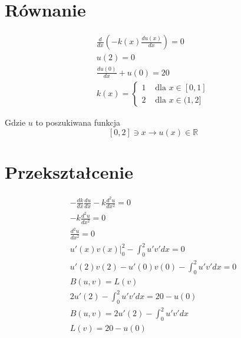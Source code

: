 \documentclass{article}
\begin{document}
\section{Równanie}
$$
\begin{gathered}
    \frac{d}{d x}(-k(x) \frac{d u(x)}{d x})=0 \\
    u(2)=0 \\
    \frac{d u(0)}{d x}+u(0)=20 \\
k(x)= \begin{cases}1 & \text { dla } x \in[0,1] \\
    2 & \text { dla } x \in(1,2]\end{cases}
\end{gathered}
$$

Gdzie $u$ to poszukiwana funkcja
$$
[0,2] \ni x \rightarrow u(x) \in \mathbb{R}
$$

\section{Przekształcenie}
$$
\begin{gathered}
-\frac{dk}{dx}\frac{du}{dx} - k\frac{d^2u}{dx^2} = 0\\
- k\frac{d^2u}{dx^2} = 0\\
\frac{d^2u}{dx^2} = 0\\
u'(x)v(x)\big\rvert^2_0 - \int_0^2u'v'dx = 0\\
u'(2)v(2) - u'(0)v(0) - \int_0^2u'v'dx = 0\\
B(u, v) = L(v)\\
2u'(2)  - \int_0^2u'v'dx = 20 - u(0)\\
B(u, v) = 2u'(2) - \int^2_0u'v'dx\\
L(v) = 20 - u(0)
\end{gathered}
$$
\end{document}
